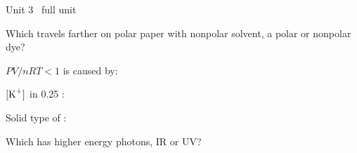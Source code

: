 \documentclass{apchem-worksheet}
\begin{document}
\begin{spiralstrip}{Unit 3 \textbullet\ full unit}
  \item Which travels farther on polar paper with nonpolar solvent, a polar
        or nonpolar dye? 
  \item $PV/nRT < 1$ is caused by: 
  \item $[\ce{K+}]$ in \SI{0.25}{\Molar} :
  \item Solid type of : 
  \item Which has higher energy photons, IR or UV?
\end{spiralstrip}
\end{document}
